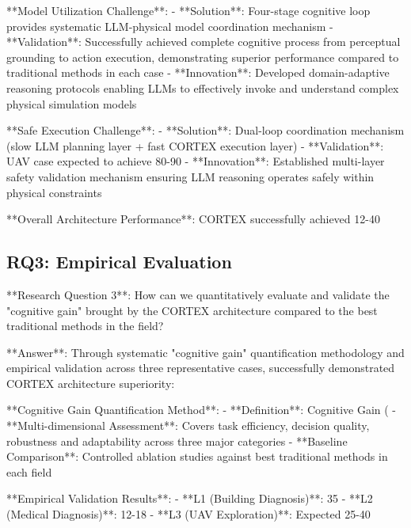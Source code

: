**Model Utilization Challenge**:
- **Solution**: Four-stage cognitive loop provides systematic LLM-physical model coordination mechanism
- **Validation**: Successfully achieved complete cognitive process from perceptual grounding to action execution, demonstrating superior performance compared to traditional methods in each case
- **Innovation**: Developed domain-adaptive reasoning protocols enabling LLMs to effectively invoke and understand complex physical simulation models

**Safe Execution Challenge**:
- **Solution**: Dual-loop coordination mechanism (slow LLM planning layer + fast CORTEX execution layer)
- **Validation**: UAV case expected to achieve 80-90%
- **Innovation**: Established multi-layer safety validation mechanism ensuring LLM reasoning operates safely within physical constraints

**Overall Architecture Performance**: CORTEX successfully achieved 12-40%

\subsection{RQ3: Empirical Evaluation}

**Research Question 3**: How can we quantitatively evaluate and validate the "cognitive gain" brought by the CORTEX architecture compared to the best traditional methods in the field?

**Answer**: Through systematic "cognitive gain" quantification methodology and empirical validation across three representative cases, successfully demonstrated CORTEX architecture superiority:

**Cognitive Gain Quantification Method**:
- **Definition**: Cognitive Gain (%
- **Multi-dimensional Assessment**: Covers task efficiency, decision quality, robustness and adaptability across three major categories
- **Baseline Comparison**: Controlled ablation studies against best traditional methods in each field

**Empirical Validation Results**:
- **L1 (Building Diagnosis)**: 35%
- **L2 (Medical Diagnosis)**: 12-18%
- **L3 (UAV Exploration)**: Expected 25-40%

